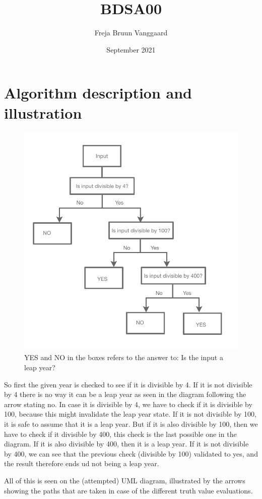 \documentclass{article}
\title{BDSA00}
\author{Freja Bruun Vanggaard}
\date{September 2021}
\begin{document}
\maketitle

\section{Algorithm description and illustration}

\begin{figure}[h!]
\centering
\includegraphics[scale=0.325]{UML1.png}
\caption{YES and NO in the boxes refers to the answer to: Is the input a leap year?}
\end{figure}


So first the given year is checked to see if it is divisible by 4. If it is not divisible by 4 there is no way it can be a leap year as seen in the diagram following the arrow stating no. In case it is divisible by 4, we have to check if it is divisible by 100, because this might invalidate the leap year state. If it is not divisible by 100, it is safe to assume that it is a leap year. But if it is also divisible by 100, then we have to check if it divisible by 400, this check is the last possible one in the diagram. If it is also divisible by 400, then it is a leap year. If it is not divisible by 400, we can see that the previous check (divisible by 100) validated to yes, and the result therefore ends ud not being a leap year.

All of this is seen on the (attempted) UML diagram, illustrated by the arrows showing the paths that are taken in case of the different truth value evaluations. 
\end{document}
